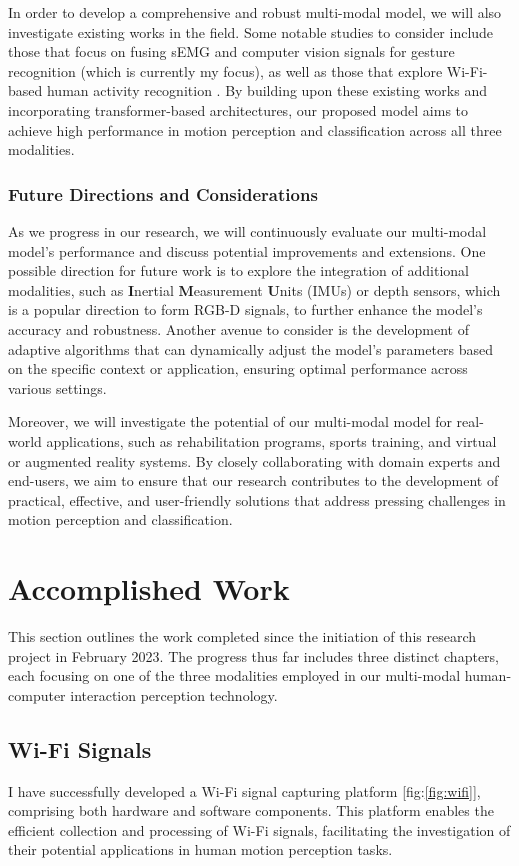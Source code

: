 \documentclass[12pt, a4paper]{article}
\newcommand{\figref}[1]{[fig:\ref{#1}]}
\begin{document}
In order to develop a comprehensive and robust multi-modal model, we will also investigate existing works in the field. Some notable studies to consider include those that focus on fusing sEMG and computer vision signals for gesture recognition \cite{Atzori2014} (which is currently my focus), as well as those that explore Wi-Fi-based human activity recognition \cite{wang2016wifi}. By building upon these existing works and incorporating transformer-based architectures, our proposed model aims to achieve high performance in motion perception and classification across all three modalities.

\subsubsection{Future Directions and Considerations}
As we progress in our research, we will continuously evaluate our multi-modal model's performance and discuss potential improvements and extensions. One possible direction for future work is to explore the integration of additional modalities, such as \textbf{I}nertial \textbf{M}easurement \textbf{U}nits (IMUs) or depth sensors, which is a popular direction to form RGB-D signals, to further enhance the model's accuracy and robustness. Another avenue to consider is the development of adaptive algorithms that can dynamically adjust the model's parameters based on the specific context or application, ensuring optimal performance across various settings.

Moreover, we will investigate the potential of our multi-modal model for real-world applications, such as rehabilitation programs, sports training, and virtual or augmented reality systems. By closely collaborating with domain experts and end-users, we aim to ensure that our research contributes to the development of practical, effective, and user-friendly solutions that address pressing challenges in motion perception and classification.\\

\newpage
\section{Accomplished Work}
This section outlines the work completed since the initiation of this research project in February 2023. The progress thus far includes three distinct chapters, each focusing on one of the three modalities employed in our multi-modal human-computer interaction perception technology.

\subsection{Wi-Fi Signals} I have successfully developed a Wi-Fi signal capturing platform \figref{fig:wifi}, comprising both hardware and software components. This platform enables the efficient collection and processing of Wi-Fi signals, facilitating the investigation of their potential applications in human motion perception tasks.
\end{document}
